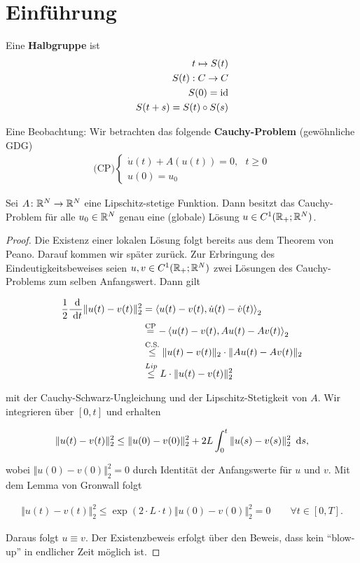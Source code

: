 \setcounter{chapter}{-1}

\chapter{Einführung}
Eine \textbf{Halbgruppe} ist
\begin{align*}
t\mapsto S(t)\\
S(t):C\to C\\
S(0)=\text{id}\\
S(t+s)=S(t)\circ S(s)
\end{align*}

Eine Beobachtung: Wir betrachten das folgende \textbf{Cauchy-Problem} (gewöhnliche GDG)
\begin{align}\label{CauchyProblem}
(\text{CP)}\left\lbrace\begin{array}{cl}
	\dot{u}(t)+A(u(t))=0,~~~t\geq0\\
	u(0) =u_0
\end{array}\right.
\end{align}

\begin{theorem}
Sei $A\colon\mathbb{R}^N\to\mathbb{R}^N$ eine Lipschitz-stetige Funktion. Dann besitzt das Cauchy-Problem für alle $u_0\in\mathbb{R}^N$ genau eine (globale) Lösung $u\in C^1(\mathbb{R}_+;\mathbb{R}^N)$.
\end{theorem}
\begin{proof}
Die Existenz einer lokalen Lösung folgt bereits aus dem Theorem von Peano. Darauf kommen wir später zurück. Zur Erbringung des Eindeutigkeitsbeweises seien $u,v\in C^1(\mathbb{R}_+;\mathbb{R}^N)$ zwei Lösungen des Cauchy-Problems zum selben Anfangswert. Dann gilt 

\begin{align*}
	\frac{1}{2}\frac{\text{ d}}{\text{ d} t}\Vert u(t)-v(t)\Vert_2^2 & =\left\langle u(t)-v(t),\dot{u}(t)-\dot{v}(t)\right\rangle_2 \\
	& \stackrel{\text{CP}}{=}-\left\langle u(t)-v(t),Au(t)-Av(t)\right\rangle_2 \\
	& \stackrel{\text{C.S.}}{\leq}\Vert u(t)-v(t)\Vert_2\cdot\Vert Au(t)-Av(t)\Vert_2 \\
	& \stackrel{Lip}{\leq} L\cdot\Vert u(t)-v(t)\Vert_2^2
\end{align*}

mit der Cauchy-Schwarz-Ungleichung und der Lipschitz-Stetigkeit von $A$. Wir integrieren über $\left[0,t\right]$ und erhalten

\begin{align*}
	\Vert u(t)-v(t)\Vert_2^2\leq\Vert u(0)-v(0)\Vert_2^2+2L\int_0^t\Vert u(s)-v(s)\Vert_2^2\,\text{ d} s,
\end{align*}

wobei $\Vert u(0)-v(0)\Vert_2^2=0$ durch Identität der Anfangswerte für $u$ und $v$. Mit dem Lemma von Gronwall folgt 

\begin{align*}
	\Vert u(t)-v(t)\Vert_2^2\leq\exp(2\cdot L\cdot t)\Vert u(0)-v(0)\Vert_2^2=0\qquad\forall t\in\left[0,T\right].
\end{align*}

Daraus folgt $u\equiv v$. Der Existenzbeweis erfolgt über den Beweis, dass kein "`blow-up"' in endlicher Zeit möglich ist.
\end{proof}

